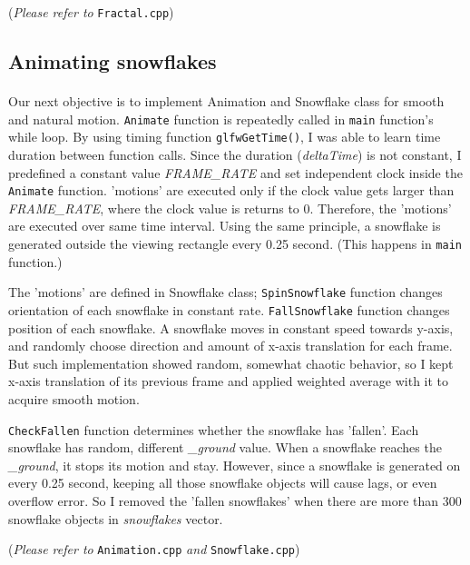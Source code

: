 \documentclass[10pt,a4paper]{article}
\begin{document}
	\begin{flushright}
		(\emph{Please refer to} \texttt{Fractal.cpp})
	\end{flushright}

	\subsection{Animating snowflakes}
	\paragraph{}
	Our next objective is to implement Animation and Snowflake class for smooth and natural motion. \texttt{Animate} function is repeatedly called in \texttt{main} function's while loop. By using timing function \texttt{glfwGetTime()}, I was able to learn time duration between function calls. Since the duration (\emph{deltaTime}) is not constant, I predefined a constant value \emph{FRAME\_RATE} and set independent clock inside the \texttt{Animate} function. 'motions' are executed only if the clock value gets larger than \emph{FRAME\_RATE}, where the clock value is returns to 0. Therefore, the 'motions' are executed over same time interval. Using the same principle, a snowflake is generated outside the viewing rectangle every 0.25 second. (This happens in \texttt{main} function.)
	
	The 'motions' are defined in Snowflake class;
	\texttt{SpinSnowflake} function changes orientation of each snowflake in constant rate. \texttt{FallSnowflake} function changes position of each snowflake. A snowflake moves in constant speed towards y-axis, and randomly choose direction and amount of x-axis translation for each frame. But such implementation showed random, somewhat chaotic behavior, so I kept x-axis translation of its previous frame and applied weighted average with it to acquire smooth motion. 
			
	\texttt{CheckFallen} function determines whether the snowflake has 'fallen'. Each snowflake has random, different \textit{\_ground} value. When a snowflake reaches the \emph{\_ground}, it stops its motion and stay. However, since a snowflake is generated on every 0.25 second, keeping all those snowflake objects will cause lags, or even overflow error. So I removed the 'fallen snowflakes' when there are more than 300 snowflake objects in \emph{snowflakes} vector.
	\begin{flushright}
		(\emph{Please refer to} \texttt{Animation.cpp} \emph{and} \texttt{Snowflake.cpp})
	\end{flushright}
	
\end{document}
